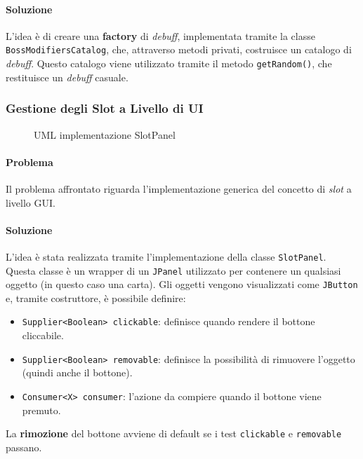 \documentclass[a4paper,12pt]{report}
\begin{document}
\paragraph{Soluzione}
L’idea è di creare una \textbf{factory} di \textit{debuff}, implementata tramite la classe \texttt{BossModifiersCatalog}, che, attraverso metodi privati, costruisce un catalogo di \textit{debuff}. Questo catalogo viene utilizzato tramite il metodo \texttt{getRandom()}, che restituisce un \textit{debuff} casuale.

\subsubsection*{Gestione degli Slot a Livello di UI}

\begin{figure}[H]
	\centering{}
	
	\caption{UML implementazione SlotPanel}
	\label{img:slotpanel}
\end{figure}

\paragraph{Problema}
Il problema affrontato riguarda l'implementazione generica del concetto di \textit{slot} a livello GUI.

\paragraph{Soluzione}
L'idea è stata realizzata tramite l'implementazione della classe \texttt{SlotPanel}. Questa classe è un wrapper di un \texttt{JPanel} utilizzato per contenere un qualsiasi oggetto (in questo caso una carta). Gli oggetti vengono visualizzati come \texttt{JButton} e, tramite costruttore, è possibile definire:

\begin{itemize}
    \item \texttt{Supplier<Boolean> clickable}: definisce quando rendere il bottone cliccabile.
    \item \texttt{Supplier<Boolean> removable}: definisce la possibilità di rimuovere l'oggetto (quindi anche il bottone).
    \item \texttt{Consumer<X> consumer}: l'azione da compiere quando il bottone viene premuto.
\end{itemize}

La \textbf{rimozione} del bottone avviene di default se i test \texttt{clickable} e \texttt{removable} passano.
\end{document}
